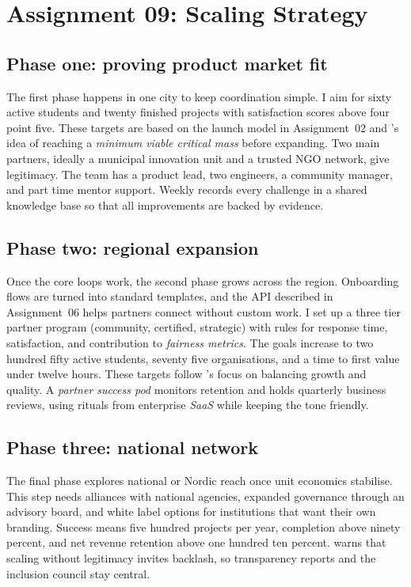 \section*{Assignment 09: Scaling Strategy}

\subsection*{Phase one: proving product market fit}
The first phase happens in one city to keep coordination simple. I aim for sixty active students and twenty finished projects with satisfaction scores above four point five. These targets are based on the launch model in Assignment~02 and \citet{Choudary2016}'s idea of reaching a \textit{minimum viable critical mass} before expanding. Two main partners, ideally a municipal innovation unit and a trusted NGO network, give legitimacy. The team has a product lead, two engineers, a community manager, and part time mentor support. Weekly records every challenge in a shared knowledge base so that all improvements are backed by evidence.

\subsection*{Phase two: regional expansion}
Once the core loops work, the second phase grows across the region. Onboarding flows are turned into standard templates, and the API described in Assignment~06 helps partners connect without custom work. I set up a three tier partner program (community, certified, strategic) with rules for response time, satisfaction, and contribution to \textit{fairness metrics}. The goals increase to two hundred fifty active students, seventy five organisations, and a time to first value under twelve hours. These targets follow \citet{HagiuWright2013}'s focus on balancing growth and quality. A \textit{partner success pod} monitors retention and holds quarterly business reviews, using rituals from enterprise \textit{SaaS} while keeping the tone friendly.

\subsection*{Phase three: national network}
The final phase explores national or Nordic reach once unit economics stabilise. This step needs alliances with national agencies, expanded governance through an advisory board, and white label options for institutions that want their own branding. Success means five hundred projects per year, completion above ninety percent, and net revenue retention above one hundred ten percent. \citet{Srnicek2017} warns that scaling without legitimacy invites backlash, so transparency reports and the inclusion council stay central.

